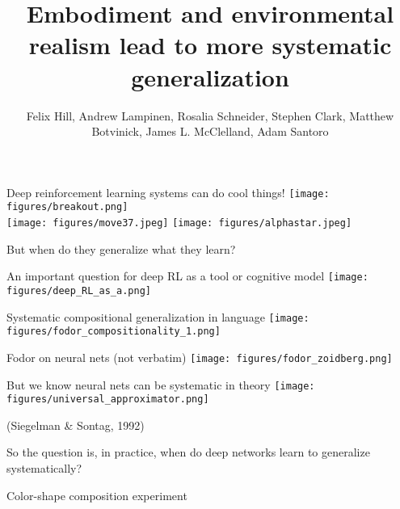\documentclass{beamer}
\begin{document}
\title{Embodiment and environmental realism lead to more systematic generalization}
\author{Felix Hill, Andrew Lampinen, Rosalia Schneider, Stephen Clark, Matthew Botvinick, James L. McClelland, Adam Santoro}
\date{}
\frame{\titlepage}

\begin{frame}{Deep reinforcement learning systems can do cool things!}
\vspace{0.5em}
\centering
\texttt{[image: figures/breakout.png]}\\[-2pt]
\texttt{[image: figures/move37.jpeg]}%
\texttt{[image: figures/alphastar.jpeg]}
\end{frame}

\begin{frame}[standout]
But when do they generalize what they learn? 
\end{frame}

\begin{frame}{An important question for deep RL as a tool or cognitive model}
\centering
\texttt{[image: figures/deep\_RL\_as\_a.png]}
\end{frame}

\begin{frame}{Systematic compositional generalization in language}
\vspace{-2em}
\centering
\texttt{[image: figures/fodor\_compositionality\_1.png]}
\end{frame}

\begin{frame}{Fodor on neural nets (not verbatim)}
\centering
\texttt{[image: figures/fodor\_zoidberg.png]}
\end{frame}


\begin{frame}{But we know neural nets can be systematic in theory}
\vspace{5em}
{
\centering
\texttt{[image: figures/universal\_approximator.png]}
}
\vspace{3em}

{\small (Siegelman \& Sontag, 1992)}
\end{frame}

\begin{frame}[standout]
So the question is, in practice, when do deep networks learn to generalize systematically? 
\end{frame}

\begin{frame}{Color-shape composition experiment}
\centering
{}
\end{frame}
\end{document}
